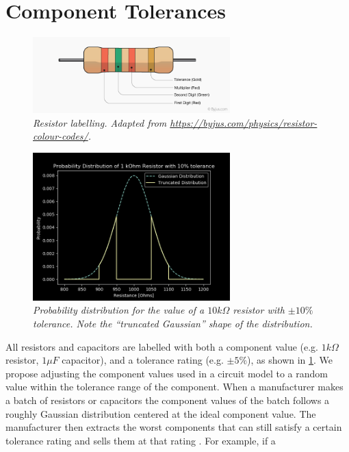 \documentclass[twoside,a4paper]{article}
\begin{document}
\section{Component Tolerances} \label{sec:tol}
%
\begin{figure}[h]
    \center
    \includegraphics[width=3in]{../CMTolerance/Pics/resistor.png}
    \caption{\label{ResistorLabel}{\it Resistor labelling. Adapted
            from \url{https://byjus.com/physics/resistor-colour-codes/}.}}
\end{figure}
%
\begin{figure}[h]
    \center
    \includegraphics[width=3in]{../CMTolerance/Pics/tgauss_pdf_better.png}
    \caption{\label{trunc_guass}{\it Probability distribution for the
            value of a $10 k\Omega$ resistor with $\pm 10\%$ tolerance.
            Note the ``truncated Gaussian'' shape of the distribution.}}
\end{figure}
%
All resistors and capacitors are labelled with both a
component value (e.g. $1 k\Omega$ resistor, $1 \mu F$
capacitor), and a tolerance rating (e.g. $\pm 5\%$), as
shown in \cref{ResistorLabel}. We propose adjusting the
component values used in a circuit model to a random
value within the tolerance range of the component.
\newline\newline
When a manufacturer makes a batch of resistors or capacitors
the component values of the batch follows a roughly Gaussian
distribution centered at the ideal component value. The manufacturer
then extracts the worst components that can still satisfy a certain
tolerance rating and sells them at that rating \cite{tolerance}.
For example, if a
\end{document}

